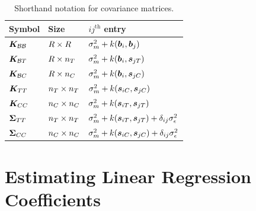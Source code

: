 \begin{appendices}
\begin{table}[bp]
    \centering
    \bgroup
    \def\arraystretch{1.2}%
    \begin{tabular}{lll}
        \hline
        Symbol & Size                       & \(ij^{\mathrm{th}}\) entry                                                      \\ \hline
        \(\bm{K}_{\mathcal{B} \mathcal{B}}\) & \(R \times R\) & \(\sigmamu^2 + k\del{\sentinel_i,\sentinel_j}\)                                 \\ 
        \(\bm{K}_{\mathcal{B} T}\) & \(R \times n_T\) & \(\sigmamu^2 + k\del{\sentinel_i,\svec_{j\treat}}\)                             \\ 
        \(\bm{K}_{\mathcal{B} C}\) & \(R \times n_C\) & \(\sigmamu^2 + k\del{\sentinel_i,\svec_{j\ctrol}}\)                             \\
        \(\bm{K}_{T T}\) & \(n_T \times n_T\) & \(\sigmamu^2 + k\del{\svec_{i\ctrol},\svec_{j\ctrol}}\)                         \\
        \(\bm{K}_{C C}\) & \(n_C \times n_C\) & \(\sigmamu^2 + k\del{\svec_{i\treat},\svec_{j\treat}}\)                         \\ 
        \(\bm{\Sigma}_{T T}\) & \(n_T \times n_T\) & \(\sigmamu^2 + k\del{\svec_{i\treat},\svec_{j\treat}} + \delta_{ij} \sigman^2\) \\ 
        \(\bm{\Sigma}_{C C}\) & \(n_C \times n_C\) & \(\sigmamu^2 + k\del{\svec_{i\ctrol},\svec_{j\ctrol}} + \delta_{ij} \sigman^2\) \\
        \hline
    \end{tabular}
    \egroup
    \caption{
        Shorthand notation for covariance matrices.
        \label{table:notation}
    }
\end{table}

\section{Estimating Linear Regression Coefficients}
\label{sec:betahat}


\end{appendices}

